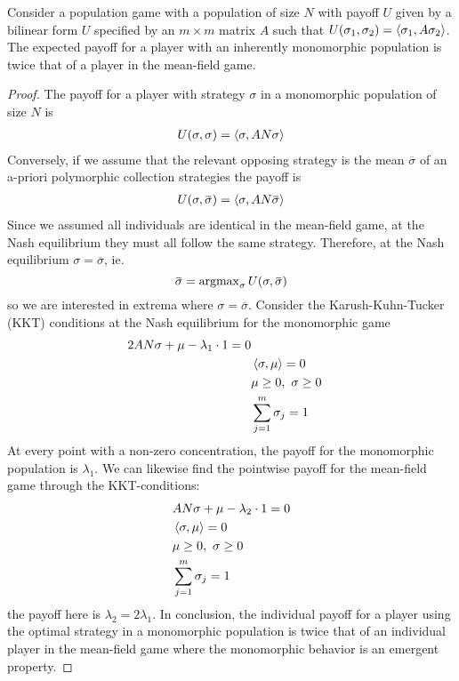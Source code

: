 \begin{proposition}
  \label{prop:doubleup}
  Consider a population game with a population of size $N$ with payoff $U$ given by a bilinear form $U$ specified by an $m\times m$ matrix $A$ such that $U(\sigma_1,\sigma_2) = \left \langle \sigma_1,A \sigma_2 \right \rangle$. The expected payoff for a player with an inherently monomorphic population is twice that of a player in the mean-field game.
\end{proposition}
\begin{proof}
The payoff for a player with strategy $\sigma$ in a monomorphic population of size $N$ is
\begin{align}
  U(\sigma,\sigma) = \left \langle \sigma,A N \sigma \right \rangle
\end{align}
Conversely, if we assume that the relevant opposing strategy is the mean $\overbar{\sigma}$ of an a-priori polymorphic collection strategies the payoff is
\begin{align}
  U(\sigma, \overbar{\sigma}) = \ip{\sigma}{AN \overbar{\sigma}}
\end{align}
Since we assumed all individuals are identical in the mean-field game, at the Nash equilibrium they must all follow the same strategy. Therefore, at the Nash equilibrium $\sigma = \overbar{\sigma}$, ie.
\begin{equation}
  \overbar{\sigma} = \argmax_{\sigma} U(\sigma,\overbar{\sigma})
\end{equation}
so we are interested in extrema where $\sigma=\overbar{\sigma}$.
Consider the Karush-Kuhn-Tucker (KKT) conditions at the Nash equilibrium for the monomorphic game
\begin{align}
  \begin{split}
    2AN\sigma + \mu - \lambda_1 \cdot 1 = 0 \\
    &\left \langle \sigma,\mu \right \rangle = 0 \\
    &\mu \geq 0,~\sigma \geq 0 \\
    &\sum_{j=1}^m \sigma_j = 1
  \end{split}
\end{align}
At every point with a non-zero concentration, the payoff for the monomorphic population is $\lambda_1$. We can likewise find the pointwise payoff for the mean-field game through the KKT-conditions:
\begin{equation}
  \begin{split}
    &AN\sigma + \mu - \lambda_2 \cdot 1 = 0 \\
    &\left \langle \sigma,\mu \right \rangle = 0 \\
    &\mu \geq 0,~\sigma \geq 0 \\
    &\sum_{j=1}^m \sigma_j = 1
  \end{split}
\end{equation}
the payoff here is $\lambda_2 = 2\lambda_1$. In conclusion, the individual payoff for a player using the optimal strategy in a monomorphic population is twice that of an individual player in the mean-field game where the monomorphic behavior is an emergent property.
\end{proof}
